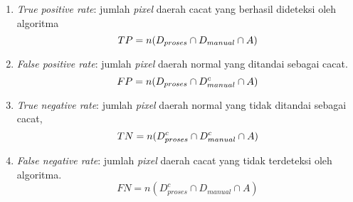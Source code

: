 \documentclass[laporan.tex]{subfiles}
\begin{document}
\begin{enumerate}
\item \emph{True positive rate}: jumlah \emph{pixel} daerah cacat yang berhasil dideteksi oleh algoritma
\begin{equation*}
TP = n(D_{proses} \cap D_{manual} \cap A) \nonumber \\
\end{equation*}
\item \emph{False positive rate}: jumlah \emph{pixel} daerah normal yang ditandai sebagai cacat.
\begin{equation*}
FP = n(D_{proses} \cap D_{manual}^c \cap A) \nonumber \\
\end{equation*}
\item \emph{True negative rate}: jumlah \emph{pixel} daerah normal yang tidak ditandai sebagai cacat, 
\begin{equation*}
TN = n(D_{proses}^c \cap D_{manual}^c \cap A) \nonumber \\
\end{equation*}
\item \emph{False negative rate}: jumlah \emph{pixel} daerah cacat yang tidak terdeteksi oleh algoritma.
\begin{equation*}
FN = n(D_{proses}^c \cap D_{manual} \cap A)
\end{equation*}
\end{enumerate}
\end{document}
